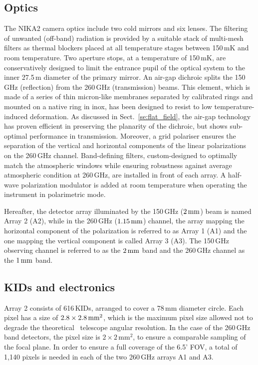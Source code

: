 \subsection{Optics}
\label{se:instru_optics}
The NIKA2 camera optics include two cold mirrors and six lenses. The
filtering of unwanted (off-band) radiation is provided by a suitable stack of
multi-mesh filters {\lp as thermal blockers} placed at all temperature
stages between 150\,mK and room temperature. {\lp Two aperture stops,
at a temperature of 150\,mK, are conservatively designed to limit the
entrance pupil of the optical system to the inner 27.5\,m diameter of
the primary mirror. }
An air-gap dichroic splits the 150\,GHz (reflection)
from the 260\,GHz (transmission) beams. {\lp This element, which is
made of a series of thin micron-like membranes separated by calibrated
rings and mounted on a native ring in inox, has been designed to
resist to low temperature-induced deformation.}
As discussed in Sect.~\ref{se:flat_field}, the air-gap technology has proven efficient
in preserving the planarity of the dichroic, but shows sub-optimal
performance in transmission. Moreover, a grid polariser ensures the
separation of the vertical and horizontal components of the linear
polarizations on the 260\,GHz channel. Band-defining filters,
custom-designed to optimally match the atmospheric windows while
ensuring robustness against average atmospheric condition at 260\,GHz,
are installed in front of each array. A half-wave polarization
modulator is added at room temperature when operating the instrument
in polarimetric mode.

Hereafter, the detector array illuminated by the 150\,GHz
($2\, \rm{mm}$) beam is named Array 2 (A2), %
while in the 260\,GHz ($1.15\, \rm{mm}$) channel, the array mapping the
horizontal component of the polarization is referred to as Array 1 (A1)
and the one mapping the vertical component is called Array 3 (A3). The
150\,GHz observing channel is referred to as the $2\, \rm{mm}$ band
and the 260\,GHz channel as the $1\, \rm{mm}$ band. 

\subsection{KIDs and electronics}
\label{se:array}

Array 2 consists of 616\,KIDs, arranged to cover a 78\,mm diameter
circle. Each pixel has a size of $2.8\times2.8\textrm{\,mm}^2$, which
is the maximum pixel size allowed not to degrade the theoretical
\trentemetre\ telescope angular resolution. In the
case of the 260\,GHz band detectors, the pixel size is $2\times
2\mathrm{\,mm}^2$, to ensure a comparable sampling of the focal
plane. In order to ensure a full coverage of the 6.5' FOV, a total of
1,140 pixels is needed in each of the two 260\,GHz arrays A1 and A3. 

